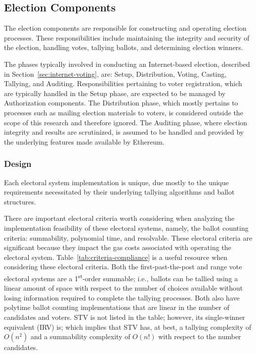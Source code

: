 \subsection{Election Components}
The election components are responsible for constructing and operating election
processes. These responsibilities include maintaining the integrity and security
of the election, handling votes, tallying ballots, and determining election
winners.

The phases typically involved in conducting an Internet-based election,
described in Section~\ref{sec:internet-voting}, are: Setup, Distribution,
Voting, Casting, Tallying, and Auditing. Responsibilities pertaining to voter
registration, which are typically handled in the Setup phase, are expected to be
managed by Authorization components. The Distribution phase, which mostly
pertains to processes such as mailing election materials to voters, is
considered outside the scope of this research and therefore ignored. The
Auditing phase, where election integrity and results are scrutinized, is assumed
to be handled and provided by the underlying features made available by
Ethereum.



\subsubsection{Design}
Each electoral system implementation is unique, due mostly to the unique
requirements necessitated by their underlying tallying algorithms and ballot
structures.

There are important electoral criteria worth considering when analyzing the
implementation feasibility of these electoral systems, namely, the ballot
counting criteria: summability, polynomial time, and resolvable. These electoral
criteria are significant because they impact the gas costs associated with
operating the electoral system. Table~\ref{tab:criteria-compliance} is a useful
resource when considering these electoral criteria. Both the first-past-the-post
and range vote electoral systems are a 1\textsuperscript{st}-order summable;
i.e., ballots can be tallied using a linear amount of space with respect to the
number of choices available without losing information required to complete the
tallying processes. Both also have polytime ballot counting implementations that
are linear in the number of candidates and voters. STV is not listed in the
table; however, its single-winner equivalent (IRV) is; which implies that STV
has, at best, a tallying complexity of $O(n^2)$ and a summability complexity
of $O(n!)$ with respect to the number candidates.

